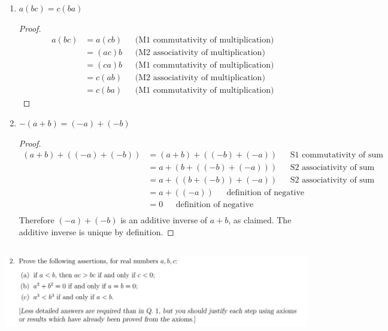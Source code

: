 \documentclass[12pt]{article}
\begin{document}
\begin{enumerate}[label=(\alph*)]
\item \begin{claim*} $a(bc) = c(ba)$\end{claim*}
  \begin{proof}
    \begin{align*}
      a(bc) &= a(cb)  ~~~~~~~ \text{(M1 commutativity of multiplication)}\\
            &= (ac)b  ~~~~~~~ \text{(M2 associativity of multiplication)}\\
            &= (ca)b  ~~~~~~~ \text{(M1 commutativity of multiplication)}\\
            &= c(ab)  ~~~~~~~ \text{(M2 associativity of multiplication)}\\
            &= c(ba)  ~~~~~~~ \text{(M1 commutativity of multiplication)}
    \end{align*}
  \end{proof}
\newpage
\item
  \begin{claim*}
    $-(a + b) = (-a) + (-b)$
  \end{claim*}
  \begin{proof}
    \begin{align*}
      (a + b) + ((-a) + (-b)) &= (a + b) + ((-b) + (-a)) ~~~~~~~ \text{S1 commutativity of sum}\\
                              &=  a + (b + ((-b) + (-a))) ~~~~~~~ \text{S2 associativity of sum}\\
                              &=  a + ((b + (-b)) + (-a)) ~~~~~~~ \text{S2 associativity of sum}\\
                              &=  a + ((-a)) ~~~~~~~ \text{definition of negative}\\
                              &=  0 ~~~~~~~ \text{definition of negative}\\
    \end{align*}
    Therefore $(-a) + (-b)$ is an additive inverse of $a + b$, as claimed. The additive inverse is
    unique by definition.
  \end{proof}
\end{enumerate}

\newpage
\subsection{}
\begin{mdframed}
  \includegraphics[width=400pt]{img/oxford-prelims-M2-analysis-I-sheet-1-2.png}
\end{mdframed}
\end{document}
